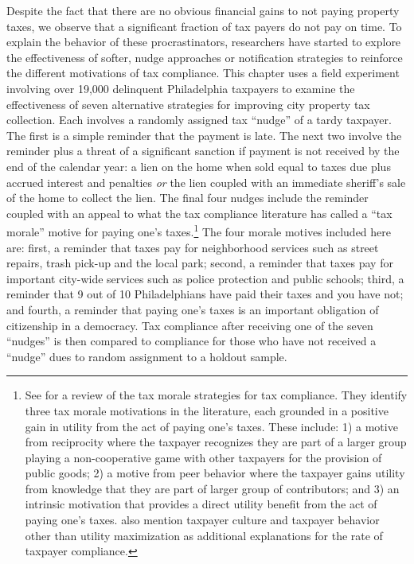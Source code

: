 Despite the fact that there are no obvious financial gains to not
paying property taxes, we observe that a significant fraction of tax
payers do not pay on time. To explain the behavior of these
procrastinators, researchers have started to explore the effectiveness
of softer, nudge approaches or notification strategies to reinforce
the different motivations of tax compliance.  This chapter uses a field
experiment involving over 19,000 delinquent Philadelphia taxpayers to
examine the effectiveness of seven alternative strategies for
improving city property tax collection. Each involves a randomly
assigned tax ``nudge'' of a tardy taxpayer.  The first is a
simple reminder that the payment is late.  The next two involve the
reminder plus a threat of a significant sanction if payment is not
received by the end of the calendar year: a lien on the home when sold
equal to taxes due plus accrued interest and penalties \textit{or} the
lien coupled with an immediate sheriff's sale of the home to collect
the lien.  The final four nudges include the reminder coupled with an
appeal to what the tax compliance literature has called a ``tax
morale'' motive for paying one's taxes.\footnote{See
  \cite{Luttmer-14} for a review of the tax morale strategies for tax
  compliance.  They identify three tax morale motivations in the
  literature, each grounded in a positive gain in utility from the act
  of paying one's taxes.  These include: 1) a motive from reciprocity
  where the taxpayer recognizes they are part of a larger group
  playing a non-cooperative game with other taxpayers for the provision of public goods; 2) a motive
  from peer behavior where the taxpayer gains utility from knowledge
  that they are part of larger group of contributors; and 3) an
  intrinsic motivation that provides a direct utility benefit from the
  act of paying one's taxes.  \cite{Luttmer-14} also mention taxpayer
  culture and taxpayer behavior other than utility maximization as
  additional explanations for the rate of taxpayer compliance. }  The
four morale motives included here are: first, a reminder that taxes
pay for neighborhood services such as street repairs, trash pick-up
and the local park; second, a reminder that taxes pay for important
city-wide services such as police protection and public schools;
third, a reminder that 9 out of 10 Philadelphians have paid their
taxes and you have not; and fourth, a reminder that paying one's taxes
is an important obligation of citizenship in a democracy.  Tax
compliance after receiving one of the seven ``nudges'' is then
compared to compliance for those who have not received a ``nudge'' 
dues to random assignment to a holdout sample.


